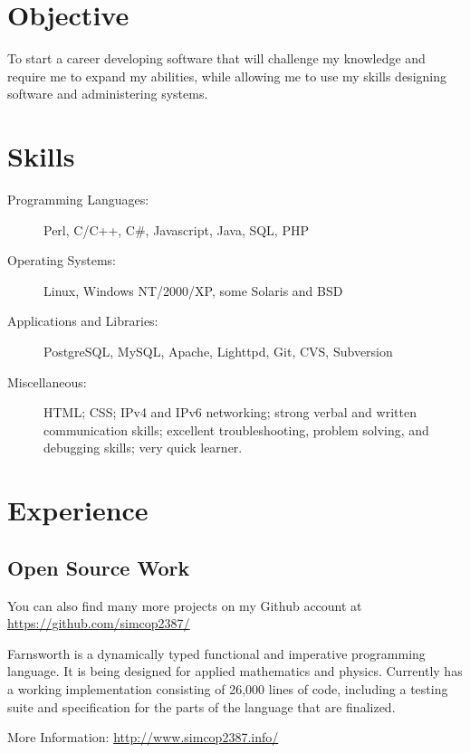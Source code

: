 \documentclass[table,tmargin=1in,bmargin=1in,letterpaper]{resume}
\author{Ryan Voots}
\begin{document}
\maketitle
\vspace{0.1in}

\section{Objective}
To start a career developing software that will challenge my knowledge and require me to expand my abilities, while allowing me to use my skills designing software and administering systems.

\section{Skills}
\begin{description}
\item[Programming Languages:]
Perl, C/C++, C\#, Javascript, Java, SQL, PHP
\item[Operating Systems:]
Linux, Windows NT/2000/XP, some Solaris and BSD
\item[Applications and Libraries:]
PostgreSQL, MySQL, Apache, Lighttpd, Git, CVS, Subversion
\item[Miscellaneous:]
HTML; CSS; IPv4 and IPv6 networking; strong verbal and written communication skills; excellent troubleshooting, problem solving, and debugging skills; very quick learner.
\end{description}

\section{Experience}

\subsection{Open Source Work}

\begin{compactitem}
\item You can also find many more projects on my Github account at \url{https://github.com/simcop2387/}
\end{compactitem}


\begin{compactitem}
\item Farnsworth is a dynamically typed functional and imperative programming language.  
It is being designed for applied mathematics and physics.  Currently has a working implementation 
consisting of 26,000 lines of code, including a testing suite and specification for the parts of the language that are finalized.
\item More Information: \url{http://www.simcop2387.info/}
\end{compactitem}
\end{document}
